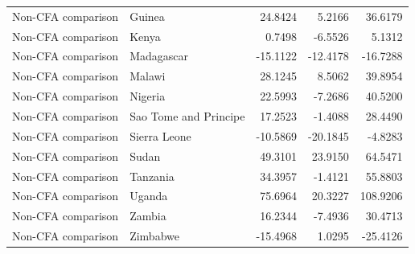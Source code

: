 \begin{table}
\begin{tabular}[t]{llrrr}
Non-CFA comparison & Guinea & 24.8424 & 5.2166 & 36.6179\\
Non-CFA comparison & Kenya & 0.7498 & -6.5526 & 5.1312\\
\addlinespace
Non-CFA comparison & Madagascar & -15.1122 & -12.4178 & -16.7288\\
Non-CFA comparison & Malawi & 28.1245 & 8.5062 & 39.8954\\
Non-CFA comparison & Nigeria & 22.5993 & -7.2686 & 40.5200\\
Non-CFA comparison & Sao Tome and Principe & 17.2523 & -1.4088 & 28.4490\\
Non-CFA comparison & Sierra Leone & -10.5869 & -20.1845 & -4.8283\\
\addlinespace
Non-CFA comparison & Sudan & 49.3101 & 23.9150 & 64.5471\\
Non-CFA comparison & Tanzania & 34.3957 & -1.4121 & 55.8803\\
Non-CFA comparison & Uganda & 75.6964 & 20.3227 & 108.9206\\
Non-CFA comparison & Zambia & 16.2344 & -7.4936 & 30.4713\\
Non-CFA comparison & Zimbabwe & -15.4968 & 1.0295 & -25.4126\\
\bottomrule
\end{tabular}
\end{table}